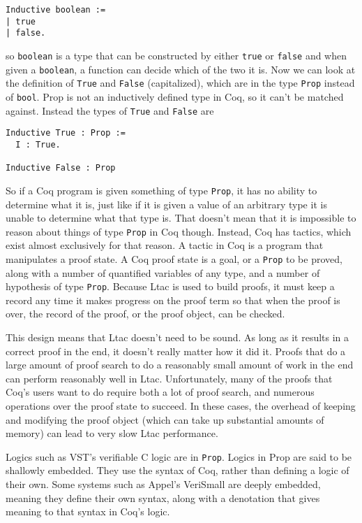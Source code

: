 \documentclass{puthesis}
\begin{document}
\begin{lstlisting}
Inductive boolean :=
| true
| false.
\end{lstlisting}

so \lstinline|boolean| is a type that can be constructed by either \lstinline|true| or \lstinline|false|
and when given a \lstinline|boolean|, a function can decide which of the two it is. Now we can look 
at the definition of \lstinline|True| and \lstinline|False| (capitalized), which are in the type 
\lstinline|Prop| instead of \lstinline|bool|. Prop is not an
inductively defined type in Coq, so it can't be matched
against. Instead the types of \lstinline|True| and \lstinline|False|
are

\begin{lstlisting}
Inductive True : Prop :=
  I : True.

Inductive False : Prop
\end{lstlisting}

So if a Coq program is given something of type \lstinline|Prop|, it
has no ability to determine what it is, just like if it is given a
value of an arbitrary type it is unable to determine what that type
is. That doesn't mean that it is impossible to reason about things of
type \lstinline|Prop| in Coq though. Instead, Coq has tactics, which
exist almost exclusively for that reason. A tactic in Coq is a program
that manipulates a proof state. A Coq proof state is a goal, or a
\lstinline|Prop| to be proved, along with a number of quantified
variables of any type, and a number of hypothesis of type
\lstinline|Prop|. Because Ltac is used to build proofs, it must keep a
record any time it makes progress on the proof term so that when the
proof is over, the record of the proof, or the proof object, can be
checked.

This design means that Ltac doesn't need to be sound. As long as it
results in a correct proof in the end, it doesn't really matter how it
did it. Proofs that do a large amount of proof search to do a
reasonably small amount of work in the end can perform reasonably well
in Ltac. Unfortunately, many of the proofs that Coq's users want to do
require both a lot of proof search, and numerous operations over the
proof state to succeed. In these cases, the overhead of keeping and
modifying the
proof object (which can take up substantial amounts of memory) can
lead to very slow Ltac performance. 

Logics such as VST's verifiable C logic are in
\lstinline|Prop|. Logics in Prop are said to be shallowly
embedded. They use the syntax of Coq, rather than defining a logic of
their own. Some systems such as Appel's VeriSmall \cite{} are deeply
embedded, meaning they define their own syntax, along with a
denotation that gives meaning to that syntax in Coq's logic. 
\end{document}
